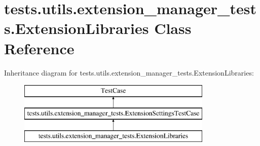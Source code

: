 \hypertarget{classtests_1_1utils_1_1extension__manager__tests_1_1ExtensionLibraries}{\section{tests.\-utils.\-extension\-\_\-manager\-\_\-tests.\-Extension\-Libraries Class Reference}
\label{classtests_1_1utils_1_1extension__manager__tests_1_1ExtensionLibraries}
}
Inheritance diagram for tests.\-utils.\-extension\-\_\-manager\-\_\-tests.\-Extension\-Libraries\-:\begin{figure}[H]
\begin{center}
\leavevmode
\includegraphics[height=3.000000cm]{classtests_1_1utils_1_1extension__manager__tests_1_1ExtensionLibraries}
\end{center}
\end{figure}
